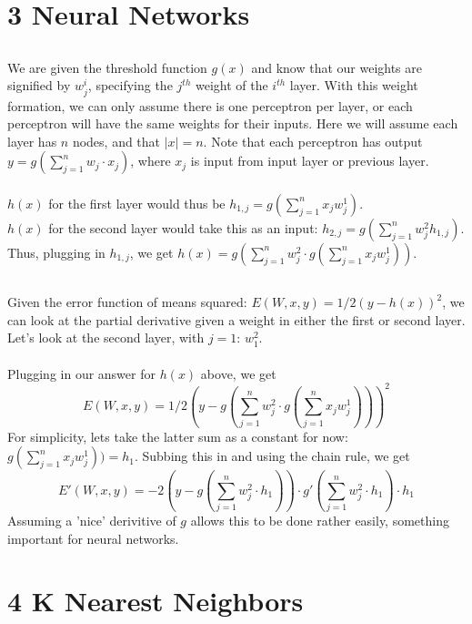 \documentclass[12pt, oneside]{article}   	%
\begin{document}
\section{3 Neural Networks}

\subsection{}

We are given the threshold function $g(x)$ and know that our weights are signified by $w^i_j$, specifying the $j^{th}$ weight of the $i^{th}$ layer. With this weight formation, we can only assume there is one perceptron per layer, or each perceptron will have the same weights for their inputs. Here we will assume each layer has $n$ nodes, and that $|x| = n$. Note that each perceptron has output $y = g(\sum_{j=1}^{n}w_j \cdot x_j)$, where $x_j$ is input from input layer or previous layer.\\ \\
$h(x)$ for the first layer would thus be $h_{1, j} = g(\sum_{j=1}^{n}x_jw^1_j)$. \\
$h(x)$ for the second layer would take this as an input: $h_{2, j} = g(\sum_{j=1}^{n}w^2_jh_{1, j})$. \\
Thus, plugging in $h_{1, j}$, we get $h(x) = g(\sum_{j=1}^{n}w^2_j \cdot g(\sum_{j=1}^{n}x_jw^1_j))$.

\subsection{}

Given the error function of means squared: $E(W, x, y) = 1/2{(y - h(x))}^2$, we can look at the partial derivative given a weight in either the first or second layer. Let's look at the second layer, with $j=1$: $w^2_1$. \\ \\
Plugging in our answer for $h(x)$ above, we get 
$$E(W, x, y) = 1/2{(y - g(\sum_{j=1}^{n}w^2_j \cdot g(\sum_{j=1}^{n}x_jw^1_j)))}^2$$
For simplicity, lets take the latter sum as a constant for now: $g(\sum_{j=1}^{n}x_jw^1_j)) = h_1$. Subbing this in and using the chain rule, we get 
$$E'(W,x,y) = -2(y - g(\sum_{j=1}^{n}w^2_j \cdot h_1)) \cdot g'(\sum_{j=1}^{n}w^2_j \cdot h_1) \cdot h_1$$
Assuming a 'nice' derivitive of $g$ allows this to be done rather easily, something important for neural networks. 

\section{4 K Nearest Neighbors}
\end{document}
